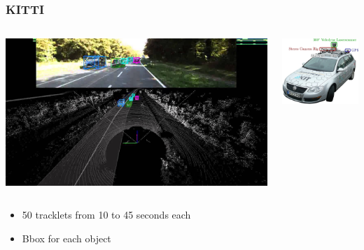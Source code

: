 \documentclass[xcolor=table,usenames,dvipsnames]{beamer}
\begin{document}
\begin{frame}
\frametitle{KITTI}
\begin{columns}
\begin{column}{0.7\textwidth}
\includegraphics[width=\textwidth, height=0.7\textheight]{img/KITTI_sample.jpg}
\end{column}
\begin{column}{0.3\textwidth}
\includegraphics[width=\textwidth]{img/KITTI_car.jpg}
\end{column}
\end{columns}
\begin{itemize}
\item 50 tracklets from 10 to 45 seconds each
\item Bbox for each object
\end{itemize}
\end{frame}
\end{document}

